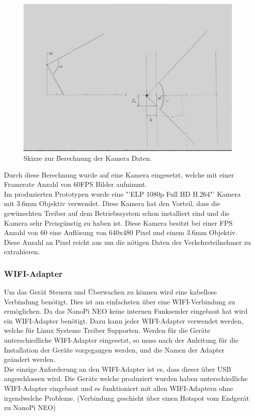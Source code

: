 \begin{figure}[H]
  \centering
  \includegraphics[height=0.49\textwidth]{Hardware/ObjektivBerechnung.jpg} 
  \caption{Skizze zur Berechnung der Kamera Daten.}
  \label{bBerechnung}
\end{figure}

Durch diese Berechnung wurde auf eine Kamera eingesetzt, welche mit einer Framerate Anzahl von 60FPS Bilder aufnimmt. \\
Im produzierten Prototypen wurde eine "'ELP 1080p Full HD H.264"' Kamera mit 3.6mm Objektiv verwendet. Diese Kamera hat den Vorteil, dass die gewünschten Treiber auf dem Betriebssystem schon installiert sind und die Kamera sehr Preisgünstig zu haben ist. Diese Kamera besitzt bei einer FPS Anzahl von 60 eine Auflösung von 640x480 Pixel und einem 3.6mm Objektiv. Diese Anzahl an Pixel reicht aus um die nötigen Daten der Verkehrsteilnehmer zu extrahieren. \cite{Kamera}

\subsubsection{WIFI-Adapter}
Um das Gerät Steuern und Überwachen zu können wird eine kabellose Verbindung benötigt. Dies ist am einfachsten über eine WIFI-Verbindung zu ermöglichen. Da das NanoPi NEO keine internen Funksender eingebaut hat wird ein WIFI-Adapter benötigt. Dazu kann jeder WIFI-Adapter verwendet werden, welche für Linux Systeme Treiber Supporten. Werden für die Geräte unterschiedliche WIFI-Adapter eingesetzt, so muss nach der Anleitung für die Installation der Geräte vorgegangen werden, und die Namen der Adapter geändert werden.\\
Die einzige Anforderung an den WIFI-Adapter ist es, dass dieser über USB angeschlossen wird. Die Geräte welche produziert wurden haben unterschiedliche WIFI-Adapter eingebaut und es funktioniert mit allen WIFI-Adaptern ohne irgendwelche Probleme. (Verbindung geschieht über einen Hotspot vom Endgerät zu NanoPi NEO)

